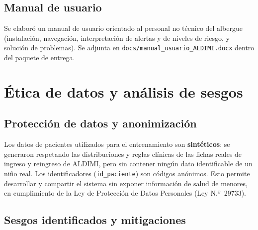 \documentclass[12pt, a4paper]{article}
\begin{document}
\subsection{Manual de usuario}

Se elabor\'o un manual de usuario orientado al personal no t\'ecnico del albergue (instalaci\'on, navegaci\'on, interpretaci\'on de alertas y de niveles de riesgo, y soluci\'on de problemas). Se adjunta en \texttt{docs/manual\_usuario\_ALDIMI.docx} dentro del paquete de entrega.

\newpage
\section{\'Etica de datos y an\'alisis de sesgos}

\subsection{Protecci\'on de datos y anonimizaci\'on}

Los datos de pacientes utilizados para el entrenamiento son \textbf{sint\'eticos}: se generaron respetando las distribuciones y reglas cl\'inicas de las fichas reales de ingreso y reingreso de ALDIMI, pero sin contener ning\'un dato identificable de un ni\~no real. Los identificadores (\texttt{id\_paciente}) son c\'odigos an\'onimos. Esto permite desarrollar y compartir el sistema sin exponer informaci\'on de salud de menores, en cumplimiento de la Ley de Protecci\'on de Datos Personales (Ley N.º~29733).

\subsection{Sesgos identificados y mitigaciones}
\end{document}
